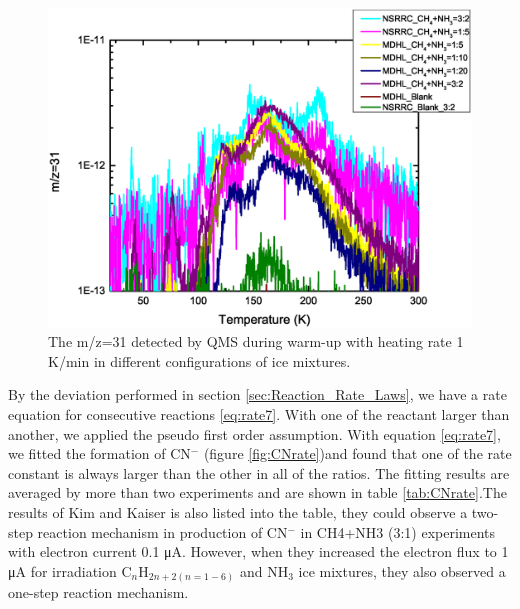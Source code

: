 \begin{figure}
\centering
\includegraphics[width=\textwidth]{figures/chapter3/Mass31.eps}
\caption{The m/z=31 detected by QMS during warm-up with heating rate 1 K/min in different configurations of ice mixtures.}
\label{fig:CNmechanism}
\end{figure}

By the deviation performed in section \ref{sec:Reaction_Rate_Laws}, we have a rate equation for consecutive reactions \ref{eq:rate7}. With one of the reactant larger than another, we applied the pseudo first order assumption. With equation \ref{eq:rate7}, we fitted the formation of CN$^-$ (figure \ref{fig:CNrate})and found that one of the rate constant is always larger than the other in all of the ratios. The fitting results are averaged by more than two experiments and are shown in table \ref{tab:CNrate}.The results of Kim and Kaiser is also listed into the table, they could observe a two-step reaction mechanism in production of CN$^-$ in CH4+NH3 (3:1) experiments with electron current 0.1 μA. However, when they increased the electron flux to 1 μA for irradiation C$_n$H$_{2n+2 (n=1-6)}$ and NH$_3$ ice mixtures, they also observed a one-step reaction mechanism.


